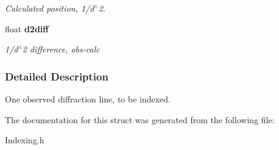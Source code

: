 \begin{DoxyCompactItemize}
\begin{DoxyCompactList}\small\item\em Calculated position, 1/d$^\wedge$2. \item\end{DoxyCompactList}\item 
float {\bf d2diff}\label{a00035_a66ae3d76c7c2173e27a142ebfcb99162}

\begin{DoxyCompactList}\small\item\em 1/d$^\wedge$2 difference, obs-\/calc \item\end{DoxyCompactList}\end{DoxyCompactItemize}


\subsubsection{Detailed Description}
One observed diffraction line, to be indexed. 

The documentation for this struct was generated from the following file:\begin{DoxyCompactItemize}
\item 
Indexing.h\end{DoxyCompactItemize}
